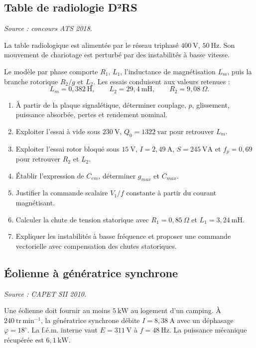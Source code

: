 \subsection{Table de radiologie D²RS}

\textit{Source : concours ATS 2018.}

La table radiologique est alimentée par le réseau triphasé $400\ \mathrm V$, $50\ \mathrm{Hz}$. Son mouvement de chariotage est perturbé par des instabilités à basse vitesse.

Le modèle par phase comporte $R_1$, $L_1$, l'inductance de magnétisation $L_m$, puis la branche rotorique $R_2/g$ et $L_2$. Les essais conduisent aux valeurs retenues :
\[
L_m=0{,}382\ \mathrm H,\qquad L_2=29{,}4\ \mathrm{mH},\qquad R_2=9{,}08\ \Omega.
\]

\begin{enumerate}
  \item À partir de la plaque signalétique, déterminer couplage, $p$, glissement, puissance absorbée, pertes et rendement nominal.
  \item Exploiter l'essai à vide sous $230\ \mathrm V$, $Q_0=1322\ \mathrm{var}$ pour retrouver $L_m$.
  \item Exploiter l'essai rotor bloqué sous $15\ \mathrm V$, $I=2{,}49\ \mathrm A$, $S=245\ \mathrm{VA}$ et $f_p=0{,}69$ pour retrouver $R_2$ et $L_2$.
  \item Établir l'expression de $C_{em}$, déterminer $g_{max}$ et $C_{max}$.
  \item Justifier la commande scalaire $V_1/f$ constante à partir du courant magnétisant.
  \item Calculer la chute de tension statorique avec $R_1=0{,}85\ \Omega$ et $L_1=3{,}24\ \mathrm{mH}$.
  \item Expliquer les instabilités à basse fréquence et proposer une commande vectorielle avec compensation des chutes statoriques.
\end{enumerate}

\subsection{Éolienne à génératrice synchrone}

\textit{Source : CAPET SII 2010.}

Une éolienne doit fournir au moins $5\ \mathrm{kW}$ au logement d'un camping. À $240\ \mathrm{tr\,min^{-1}}$, la génératrice synchrone débite $I=8{,}38\ \mathrm A$ avec un déphasage $\varphi=18^\circ$. La f.é.m. interne vaut $E=311\ \mathrm V$ à $f=48\ \mathrm{Hz}$. La puissance mécanique récupérée est $6{,}1\ \mathrm{kW}$.


